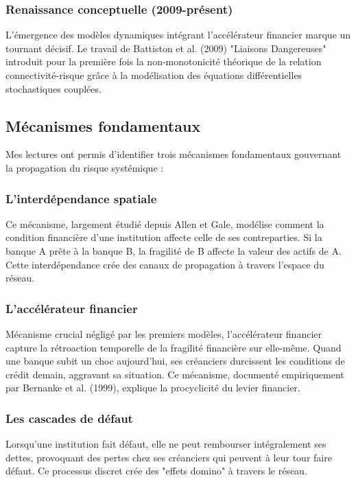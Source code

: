 \documentclass[12pt,a4paper,twoside]{article}
\begin{document}
\subsubsection{Renaissance conceptuelle (2009-présent)}

L'émergence des modèles dynamiques intégrant l'accélérateur financier marque un tournant décisif. Le travail de Battiston et al. (2009) "Liaisons Dangereuses" introduit pour la première fois la non-monotonicité théorique de la relation connectivité-risque grâce à la modélisation des équations différentielles stochastiques couplées.

\subsection{Mécanismes fondamentaux}

Mes lectures ont permis d'identifier trois mécanismes fondamentaux gouvernant la propagation du risque systémique :

\subsubsection{L'interdépendance spatiale}

Ce mécanisme, largement étudié depuis Allen et Gale, modélise comment la condition financière d'une institution affecte celle de ses contreparties. Si la banque A prête à la banque B, la fragilité de B affecte la valeur des actifs de A. Cette interdépendance crée des canaux de propagation à travers l'espace du réseau.

\subsubsection{L'accélérateur financier}

Mécanisme crucial négligé par les premiers modèles, l'accélérateur financier capture la rétroaction temporelle de la fragilité financière sur elle-même. Quand une banque subit un choc aujourd'hui, ses créanciers durcissent les conditions de crédit demain, aggravant sa situation. Ce mécanisme, documenté empiriquement par Bernanke et al. (1999), explique la procyclicité du levier financier.

\subsubsection{Les cascades de défaut}

Lorsqu'une institution fait défaut, elle ne peut rembourser intégralement ses dettes, provoquant des pertes chez ses créanciers qui peuvent à leur tour faire défaut. Ce processus discret crée des "effets domino" à travers le réseau.
\end{document}
